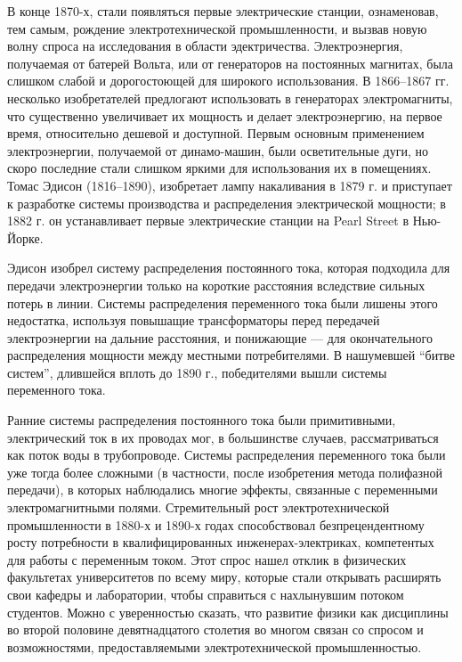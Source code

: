 \documentclass[12pt, oneside, a4paper]{article}
\begin{document}
В конце 1870-х, стали появляться первые электрические станции, ознаменовав, тем самым, рождение электротехнической промышленности, и вызвав новую волну спроса на исследования в области эдектричества. Электроэнергия, получаемая от батерей Вольта, или от генераторов на постоянных магнитах, была слишком слабой и дорогостоющей для широкого использования. В 1866--1867 гг. несколько изобретателей предлогают использовать в генераторах электромагниты, что существенно увеличивает их мощность и делает электроэнергию, на первое время, относительно дешевой и доступной. Первым основным применением электроэнергии, получаемой от динамо-машин, были осветительные дуги, но скоро последние стали слишком яркими для использования их в помещениях. Томас Эдисон (1816--1890), изобретает лампу накаливания в 1879 г. и приступает к разработке системы производства и распределения электрической мощности; в 1882 г. он устанавливает первые электрические станции на Pearl Street в Нью-Йорке.

Эдисон изобрел систему распределения постоянного тока, которая подходила для передачи электроэнергии только на короткие расстояния вследствие сильных потерь в линии. Системы распределения переменного тока были лишены этого недостатка, используя повышащие трансформаторы перед передачей электроэнергии на дальние расстояния, и понижающие --- для окончательного распределения мощности между местными потребителями. В нашумевшей ``битве систем'', длившейся вплоть до 1890 г., победителями вышли системы переменного тока.

Ранние системы распределения постоянного тока были примитивными, электрический ток в их проводах мог, в большинстве случаев, рассматриваться как поток воды в трубопроводе. Системы распределения переменного тока были уже тогда более сложными (в частности, после изобретения метода полифазной передачи), в которых наблюдались многие эффекты, связанные с переменными электромагнитными полями. Стремительный рост электротехнической промышленности в 1880-х и 1890-х годах способствовал безпрецендентному росту потребности в квалифицированных инженерах-электриках, компетентых для работы с переменным током. Этот спрос нашел отклик в физических факультетах университетов по всему миру, которые стали открывать расширять свои кафедры и лаборатории, чтобы справиться с нахлынувшим потоком студентов. Можно с уверенностью сказать, что развитие физики как дисциплины во второй половине девятнадцатого столетия во многом связан со спросом и возможностями, предоставляемыми электротехнической промышленностью. 
\end{document}
